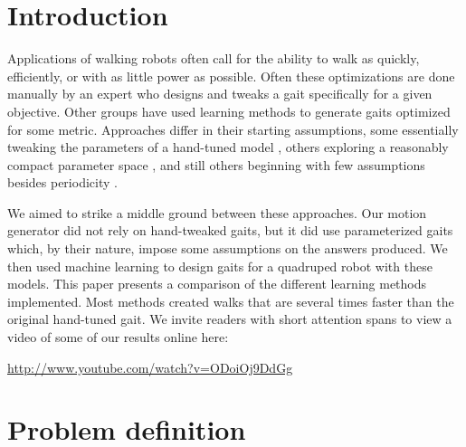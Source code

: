 \section{Introduction}


Applications of walking robots often call for the ability to walk as
quickly, efficiently, or with as little power as possible.  Often
these optimizations are done manually by an expert who designs and
tweaks a gait specifically for a given objective.  Other groups have
used learning methods to generate gaits optimized for some metric.
Approaches differ in their starting assumptions, some essentially
tweaking the parameters of a hand-tuned model \cite{chernova}, others
exploring a reasonably compact parameter space \cite{kohl}, and still
others beginning with few assumptions besides periodicity
\cite{zykov}.

We aimed to strike a middle ground between these approaches.  Our
motion generator did not rely on hand-tweaked gaits, but it did use
parameterized gaits which, by their nature, impose some assumptions on
the answers produced.  We then used machine learning to design gaits
for a quadruped robot with these models.  This paper presents a
comparison of the different learning methods implemented.  Most
methods created walks that are several times faster than the original
hand-tuned gait.  We invite readers with short attention spans to view
a video of some of our results online here:

\url{http://www.youtube.com/watch?v=ODoiOj9DdGg}





\section{Problem definition}

